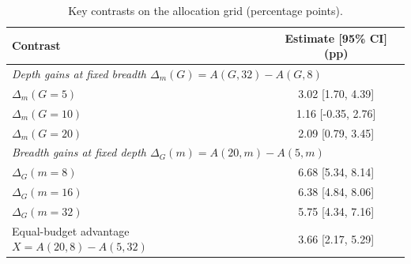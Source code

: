 \begin{table}[htbp]
\centering
\small
\begin{tabular}{lc}
\toprule
Contrast & Estimate [95\% CI] (pp) \\
\midrule
\multicolumn{2}{l}{\textit{Depth gains at fixed breadth $\Delta_m(G) = A(G, 32) - A(G, 8)$}} \\
$\Delta_m(G=5)$ & 3.02 [1.70, 4.39] \\
$\Delta_m(G=10)$ & 1.16 [-0.35, 2.76] \\
$\Delta_m(G=20)$ & 2.09 [0.79, 3.45] \\
\midrule
\multicolumn{2}{l}{\textit{Breadth gains at fixed depth $\Delta_G(m) = A(20, m) - A(5, m)$}} \\
$\Delta_G(m=8)$ & 6.68 [5.34, 8.14] \\
$\Delta_G(m=16)$ & 6.38 [4.84, 8.06] \\
$\Delta_G(m=32)$ & 5.75 [4.34, 7.16] \\
\midrule
Equal-budget advantage $X = A(20, 8) - A(5, 32)$ & 3.66 [2.17, 5.29] \\
\bottomrule
\end{tabular}
\caption{Key contrasts on the allocation grid (percentage points).}
\label{tab:breadth_contrasts}
\end{table}
